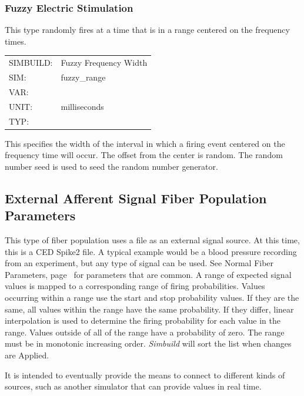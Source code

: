 \documentclass[12pt,openany,oneside]{book}
\newcommand{\tiref}[1]{#1, page~\pageref{#1}}
\newcommand{\prog}[1]{\textit{{#1}}}
\begin{document}
\subsubsection{Fuzzy Electric Stimulation}
\label{Fuzzy Electric Stimulation}
This type randomly fires at a time that is in a range centered on the
frequency times.

\begin{flushleft}
\begin{tabular}{@{}ll@{}}
SIMBUILD: & Fuzzy Frequency Width\\
SIM: & fuzzy\_range\\
VAR: &\\
UNIT: & milliseconds\\
TYP: &\\
\end{tabular}
\end{flushleft}
\noindent
This specifies the width of the interval in which a firing event centered
on the frequency time will occur. The offset from the center is random.
The random number seed is used to seed the random number generator.



\subsection{External Afferent Signal Fiber Population Parameters}
\label{External Afferent Signal Population Parameters}
\noindent
This type of fiber population uses a file as an external signal source. At
this time, this is a CED Spike2 file. A typical example would be a blood
pressure recording from an experiment, but any type of signal can be used.
See \tiref{Normal Fiber Parameters} for parameters that are common.  A
range of expected signal values is mapped to a corresponding range of 
firing probabilities. Values occurring within a range use the start and
stop probability values. If they are the same, all values within the range
have the same probability. If they differ, linear interpolation is used to
determine the firing probability for each value in the range. Values
outside of all of the range have a probability of zero. The range must be
in monotonic increasing order. \prog{Simbuild} will sort the list when changes
are Applied.

It is intended to eventually provide the means to connect to different
kinds of sources, such as another simulator that can provide values in
real time.
\end{document}
